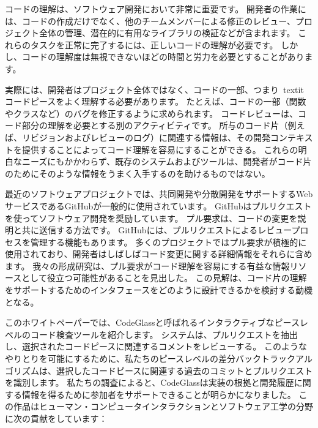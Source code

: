 コードの理解は、ソフトウェア開発において非常に重要です。
開発者の作業には、コードの作成だけでなく、他のチームメンバーによる修正のレビュー、プロジェクト全体の管理、潜在的に有用なライブラリの検証などが含まれます。
これらのタスクを正常に完了するには、正しいコードの理解が必要です。
しかし、コードの理解度は無視できないほどの時間と労力を必要とすることがあります。

実際には、開発者はプロジェクト全体ではなく、コードの一部、つまり\ textit {コードピース}をよく理解する必要があります。
たとえば、コードの一部（関数やクラスなど）のバグを修正するように求められます。
コードレビューは、コード部分の理解を必要とする別のアクティビティです。
所与のコード片（例えば、リビジョンおよびレビューのログ）に関連する情報は、その開発コンテキストを提供することによってコード理解を容易にすることができる。
これらの明白なニーズにもかかわらず、既存のシステムおよびツールは、開発者がコード片のためにそのような情報をうまく入手するのを助けるものではない。


最近のソフトウェアプロジェクトでは、共同開発や分散開発をサポートするWebサービスであるGitHubが一般的に使用されています。
GitHubはプルリクエストを使ってソフトウェア開発を奨励しています。
プル要求は、コードの変更を説明と共に送信する方法です。
GitHubには、プルリクエストによるレビュープロセスを管理する機能もあります。
多くのプロジェクトではプル要求が積極的に使用されており、開発者はしばしばコード変更に関する詳細情報をそれらに含めます。
我々の形成研究は、プル要求がコード理解を容易にする有益な情報リソースとして役立つ可能性があることを見出した。
この見解は、コード片の理解をサポートするためのインタフェースをどのように設計できるかを検討する動機となる。

このホワイトペーパーでは、CodeGlassと呼ばれるインタラクティブなピースレベルのコード検査ツールを紹介します。
システムは、プルリクエストを抽出し、選択されたコードピースに関連するコメントをレビューする。
このようなやりとりを可能にするために、私たちのピースレベルの差分バックトラックアルゴリズムは、選択したコードピースに関連する過去のコミットとプルリクエストを識別します。
私たちの調査によると、CodeGlassは実装の根拠と開発履歴に関する情報を得るために参加者をサポートできることが明らかになりました。
この作品はヒューマン・コンピュータインタラクションとソフトウェア工学の分野に次の貢献をしています：

